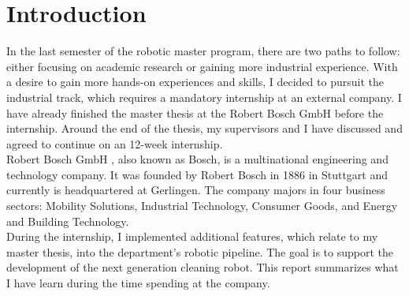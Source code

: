 \chapter{Introduction}

In the last semester of the robotic master program, there are two paths to follow: either focusing on academic research or gaining more industrial experience. With a desire to gain more hands-on experiences and skills, I decided to pursuit the industrial track, which requires a mandatory internship at an external company. I have already finished the master thesis at the Robert Bosch GmbH before the internship. Around the end of the thesis, my supervisors and I have discussed and agreed to continue on an 12-week internship.\\

Robert Bosch GmbH \cite{bosch}, also known as Bosch, is a multinational engineering and technology company. It was founded by Robert Bosch in 1886 in Stuttgart and currently is headquartered at Gerlingen. The company majors in four business sectors: Mobility Solutions, Industrial Technology, Consumer Goods, and Energy and Building Technology.\\

During the internship, I implemented additional features, which relate to my master thesis, into the department's robotic pipeline. The goal is to support the development of the next generation cleaning robot. This report summarizes what I have learn during the time spending at the company.
\clearpage